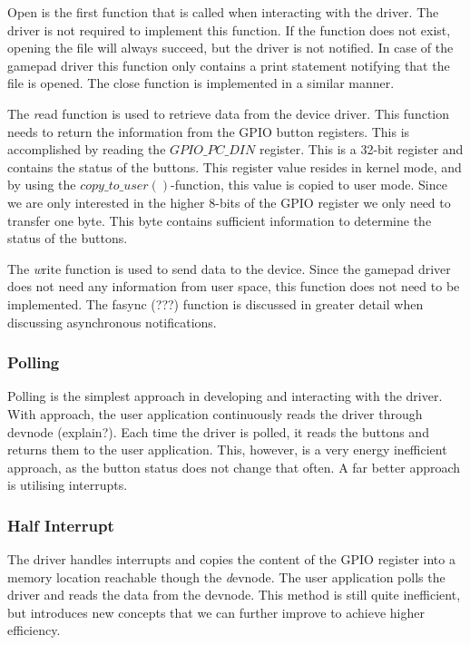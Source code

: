 Open is the first function that is called when interacting with the driver. The driver is not required to implement this function. If the function does not exist, opening the file will always succeed, but the driver is not notified. In case of the gamepad driver this function only contains a print statement notifying that the file is opened. The close function is implemented in a similar manner. 

The \emph read function is used to retrieve data from the device driver. This function needs to return the information from the GPIO button registers. This is accomplished by reading the $GPIO\_PC\_DIN$ register. This is a 32-bit register and contains the status of the buttons. This register value resides in kernel mode, and by using the  $copy\_to\_user()$-function, this value is copied to user mode. Since we are only interested in the higher 8-bits of the GPIO register we only need to transfer one byte. This byte contains sufficient information to determine the status of the buttons. 

The \emph write function is used to send data to the device. Since the gamepad driver does not need any information from user space, this function does not need to be implemented. The fasync (???) function is discussed in greater detail when discussing asynchronous notifications. 




\subsubsection{Polling}
Polling is the simplest approach in developing and interacting with the driver. With approach, the user application continuously reads the driver through devnode (explain?). Each time the driver is polled, it reads the buttons and returns them to the user application. This, however, is a very energy inefficient approach, as the button status does not change that often. A far better approach is utilising interrupts. 


\subsubsection{Half Interrupt}
The driver handles interrupts and copies the content of the GPIO register into a memory location reachable though the {\emph devnode}. The user application polls the driver and reads the data from the devnode. This method is still quite inefficient, but introduces new concepts that we can further improve to achieve higher efficiency. 

